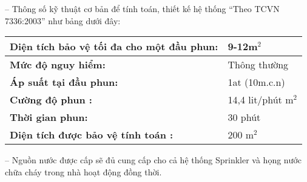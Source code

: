 -- Thông số kỹ thuật cơ bản để tính toán, thiết kế hệ thống “Theo TCVN 7336:2003” như bảng dưới đây:
\begin{table}[H]
	\centering
	\begin{tabular}{|l|l|}
		\hline
		\textbf{Diện tích bảo vệ tối đa cho một đầu phun: } & \textcolor[rgb]{ 1,  0,  0}{9-12m$^2$} \bigstrut\\
		\hline
		\textbf{Mức độ nguy hiểm:} & \textcolor[rgb]{ 1,  0,  0}{Thông thường} \bigstrut\\
		\hline
		\textbf{Áp suất tại đầu phun: } & \textcolor[rgb]{ 1,  0,  0}{1at (10m.c.n)} \bigstrut\\
		\hline
		\textbf{Cường độ phun :} & \textcolor[rgb]{ 1,  0,  0}{14,4 lit/phút m$^2$} \bigstrut\\
		\hline
		\textbf{Thời gian phun: } & \textcolor[rgb]{ 1,  0,  0}{30 phút} \bigstrut\\
		\hline
		\textbf{Diện tích được bảo vệ tính toán :} & \textcolor[rgb]{ 1,  0,  0}{200 m$^2$} \bigstrut\\
		\hline
	\end{tabular}%
	\label{b:pcccts}%
\end{table}%

-- Nguồn nước được cấp sẽ đủ cung cấp cho cả hệ thống Sprinkler và họng nước chữa cháy trong nhà hoạt động đồng thời.


